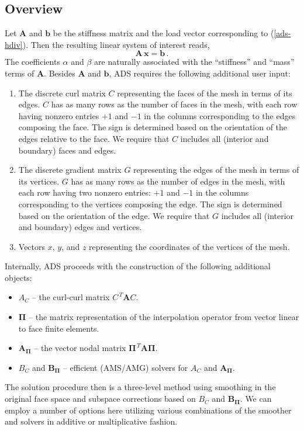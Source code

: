 \subsection{Overview}
Let ${\mathbf A}$ and ${\mathbf b}$ be the stiffness matrix and  the
load vector corresponding to (\ref{ads-hdiv}). Then the resulting
linear system of interest reads,
\begin{equation} \label{ads-hdiv-ls}
{\mathbf A}\, {\mathbf x} = {\mathbf b} \,.
\end{equation}
The coefficients $\alpha$ and $\beta$ are naturally associated with
the ``stiffness'' and ``mass'' terms of ${\mathbf A}$.
Besides ${\mathbf A}$ and ${\mathbf b}$, ADS requires the following
additional user input:
\begin{enumerate}
\item The discrete curl matrix $C$ representing the faces of the mesh in terms
  of its edges. $C$ has as many rows as the number of faces in the mesh, with
  each row having nonzero entries $+1$ and $-1$ in the columns corresponding to
  the edges composing the face. The sign is determined based on the orientation
  of the edges relative to the face.  We require that $C$ includes all (interior
  and boundary) faces and edges.

\item The discrete gradient matrix $G$ representing the edges of the mesh in
  terms of its vertices. $G$ has as many rows as the number of edges in the
  mesh, with each row having two nonzero entries: $+1$ and $-1$ in the columns
  corresponding to the vertices composing the edge. The sign is determined based
  on the orientation of the edge.  We require that $G$ includes all (interior
  and boundary) edges and vertices.

\item Vectors $x$, $y$, and $z$ representing the coordinates of the vertices of
  the mesh.
\end{enumerate}

\noindent
Internally, ADS proceeds with the construction of the following additional objects:
\begin{itemize}
\item $A_C$ -- the curl-curl matrix $C^{\,T} {\mathbf A} C$.
\item ${\mathbf \Pi}$ -- the matrix representation of the interpolation operator
from vector linear to face finite elements.
\item ${\mathbf A}_{{\mathbf \Pi}}$ -- the vector nodal matrix ${\mathbf \Pi}^{\,T} {\mathbf A} {\mathbf \Pi}$.
\item $B_C$ and ${\mathbf B}_{{\mathbf \Pi}}$ -- efficient (AMS/AMG) solvers for $A_C$ and ${\mathbf A}_{{\mathbf \Pi}}$.
\end{itemize}
The solution procedure then is a three-level method using smoothing in the
original face space and subspace corrections based on $B_C$ and ${\mathbf
  B}_{{\mathbf \Pi}}$.  We can employ a number of options here utilizing various
combinations of the smoother and solvers in additive or multiplicative fashion.

